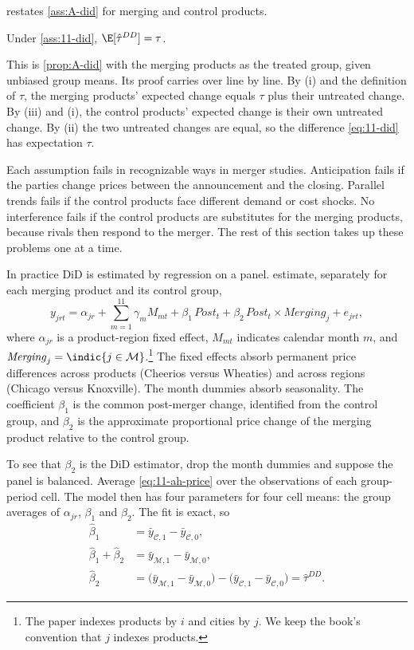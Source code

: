  restates \cref{ass:A-did} for merging and control products.

\begin{proposition}\label{prop:11-did}
Under \cref{ass:11-did}, $\E[\hat\tau^{DD}]=\tau$.
\end{proposition}

This is \cref{prop:A-did} with the merging products as the treated group, given unbiased group means. Its proof
carries over line by line. By (i) and the definition of $\tau$, the merging products' expected change equals $\tau$
plus their untreated change. By (iii) and (i), the control products' expected change is their own untreated change.
By (ii) the two untreated changes are equal, so the difference \eqref{eq:11-did} has expectation $\tau$.

Each assumption fails in recognizable ways in merger studies. Anticipation fails if the parties change prices
between the announcement and the closing. Parallel trends fails if the control products face different demand or
cost shocks. No interference fails if the control products are substitutes for the merging products, because
rivals then respond to the merger. The rest of this section takes up these problems one at a time.

 In practice DiD is estimated by regression on a panel. \citet{AshenfelterHosken2010}
estimate, separately for each merging product and its control group,
\begin{equation}\label{eq:11-ah-price}
y_{jrt}=\alpha_{jr}+\sum_{m=1}^{11}\gamma_m M_{mt}+\beta_1\,\mathit{Post}_t+\beta_2\,\mathit{Post}_t\times\mathit{Merging}_j+e_{jrt},
\end{equation}
where $\alpha_{jr}$ is a product-region fixed effect, $M_{mt}$ indicates calendar month $m$, and
$\mathit{Merging}_j=\indic\{j\in\mathcal{M}\}$.\footnote{The paper indexes products by $i$ and cities by $j$. We
keep the book's convention that $j$ indexes products.} The fixed effects absorb permanent price differences
across products (Cheerios versus Wheaties) and across regions (Chicago versus Knoxville). The month dummies
absorb seasonality. The coefficient $\beta_1$ is the common post-merger change, identified from the control group,
and $\beta_2$ is the approximate proportional price change of the merging product relative to the control group.

To see that $\beta_2$ is the DiD estimator, drop the month dummies and suppose the panel is balanced. Average
\eqref{eq:11-ah-price} over the observations of each group-period cell. The model then has four parameters for
four cell means: the group averages of $\alpha_{jr}$, $\beta_1$ and $\beta_2$. The fit is exact, so
\begin{align*}
\hat\beta_1&=\bar y_{\mathcal{C},1}-\bar y_{\mathcal{C},0},\\
\hat\beta_1+\hat\beta_2&=\bar y_{\mathcal{M},1}-\bar y_{\mathcal{M},0},\\
\hat\beta_2&=\big(\bar y_{\mathcal{M},1}-\bar y_{\mathcal{M},0}\big)-\big(\bar y_{\mathcal{C},1}-\bar y_{\mathcal{C},0}\big)=\hat\tau^{DD}.
\end{align*}

